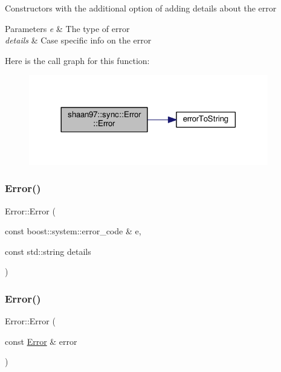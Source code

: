 Constructors with the additional option of adding details about the error 
\begin{DoxyParams}{Parameters}
{\em e} & The type of error \\
\hline
{\em details} & Case specific info on the error \\
\hline
\end{DoxyParams}
Here is the call graph for this function\+:\nopagebreak
\begin{figure}[H]
\begin{center}
\leavevmode
\includegraphics[width=296pt]{classshaan97_1_1sync_1_1_error_ad98956db1a62bc2269b27e4ba252a598_cgraph}
\end{center}
\end{figure}
\mbox{\label{classshaan97_1_1sync_1_1_error_aa8237d2411892451c587189721b7e0c3}} 
\subsubsection{\texorpdfstring{Error()}{Error()}\hspace{0.1cm}{\footnotesize\ttfamily [4/6]}}
{\footnotesize\ttfamily Error\+::\+Error (\begin{DoxyParamCaption}\item[{const boost\+::system\+::error\+\_\+code \&}]{e,  }\item[{const std\+::string}]{details }\end{DoxyParamCaption})}

\mbox{\label{classshaan97_1_1sync_1_1_error_aef2207b7ee0f2c8105bed5cffda76c68}} 
\subsubsection{\texorpdfstring{Error()}{Error()}\hspace{0.1cm}{\footnotesize\ttfamily [5/6]}}
{\footnotesize\ttfamily Error\+::\+Error (\begin{DoxyParamCaption}\item[{const \hyperlink{classshaan97_1_1sync_1_1_error}{Error} \&}]{error }\end{DoxyParamCaption})}



